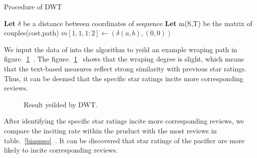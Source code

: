 \documentclass[12pt]{article}%
\begin{document}
\begin{algorithm}[H]
	\caption{Procedure of DWT}  
	\LinesNumbered  
	\textbf{Let} $\delta$ be a distance between coordinates of sequence \newline
    \textbf{Let} m(S,T) be the matrix of couples(cost,path)\newline
   $ m[1,1,1:2]\leftarrow(\delta(a,b),(0,0)) $\newline
\end{algorithm} 
We input the data of  into the algorithm to yeild an example wraping path in figure.~\ref{FFFF}~. The figure.~\ref{FFFF}~ shows that the wraping degree is slight, which means that the text-based measures reflect strong similarity with previous star ratings. Thus, it can be deemed that the specific star ratings incite more corresponding reviews.
\begin{figure}[H]
	\centering
	\caption{ Result yeilded by DWT.}
	\label{FFFF}
\end{figure}
After identifying the specific star ratings incite more corresponding reviews, we compare the inciting rate within the pruduct with the most reviews in table.~\ref{biasssso}~. It can be discovered that star ratings of the pacifier are more likely to incite corresponding reviews.
\end{document}
